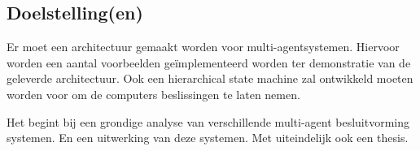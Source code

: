 \documentclass[a4paper]{article}
\begin{document}
    \newpage

    \subsection{Doelstelling(en)}
      Er moet een architectuur gemaakt worden voor multi-agentsystemen. Hiervoor
      worden een aantal voorbeelden geïmplementeerd worden ter demonstratie van
      de geleverde architectuur. Ook een hierarchical state machine zal ontwikkeld
      moeten worden voor om de computers beslissingen te laten nemen.\par
      Het begint bij een grondige analyse van verschillende multi-agent besluitvorming
      systemen. En een uitwerking van deze systemen. Met uiteindelijk ook een thesis.

    \newpage
\end{document}
